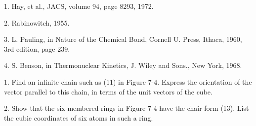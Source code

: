 \bigskip


\item {1.} Hay, et al., JACS, volume 94, page 8293, 1972.

\item {2.} Rabinowitch, 1955.

\item {3.} L. Pauling, in Nature of the Chemical Bond, Cornell U. Press, 
Ithaca, 1960, 3rd edition, page 239.

\item {4.} S. Benson, in Thermonuclear Kinetics, J. Wiley and Sons.,
 New York, 1968.

\bigskip


\item {1.} Find an infinite chain such as (11) in Figure 7-4.  Express 
the orientation of the vector parallel to this chain, in terms of the 
unit vectors of the cube.

\item {2.} Show that the six-membered rings in Figure 7-4 have the chair form 
(13).  List the cubic coordinates of six atoms in such a ring.

\bigskip

